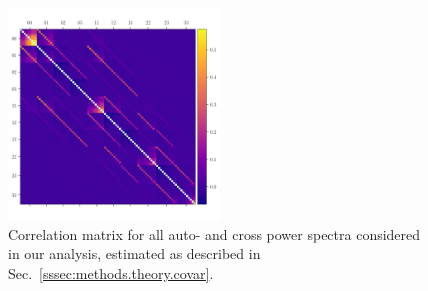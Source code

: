 \documentclass[a4paper,11pt]{article}
\begin{document}
\begin{figure}
\begin{center}
\includegraphics[width=0.5\textwidth]{figures/covmat_HSC_dg_hoddg_hodxdg_hoddg_hod_trisp=4h3h2h_SSC=LINBIAS-resp_l=ells_eff_all_wcross_clfit=HOD-zevol_culled=True_coadd=area_G+NG+SSC.pdf}
\caption{Correlation matrix for all auto- and cross power spectra considered in our analysis, estimated as described in Sec.~\ref{sssec:methods.theory.covar}.}
\label{fig:covmat}
\end{center}
\end{figure}
\end{document}
